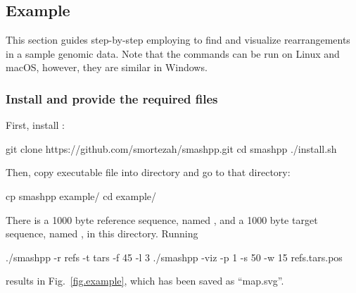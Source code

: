 \documentclass[a4paper,9pt]{extarticle}
\begin{document}



\subsection{Example}
This section guides step-by-step employing \smashpp to find and visualize rearrangements in a sample genomic data. Note that the commands can be run on Linux and macOS, however, they are similar in Windows.

\subsubsection*{Install \smashpp and provide the required files}
First, install \smashpp:
\begin{code}[style=bash]
git clone https://github.com/smortezah/smashpp.git
cd smashpp
./install.sh
\end{code}
Then, copy  executable file into  directory and go to that directory:
\begin{code}[style=bash]
cp smashpp example/
cd example/
\end{code}
There is a 1000 byte reference sequence, named , and a 1000 byte target sequence, named , in this directory. Running
\begin{code}[style=bash]
./smashpp -r refs -t tars -f 45 -l 3
./smashpp -viz -p 1 -s 50 -w 15 refs.tars.pos
\end{code}
results in Fig.~\ref{fig.example}, which has been saved as ``map.svg''.


\clearpage
{}    %
\small
{}


\end{document}
